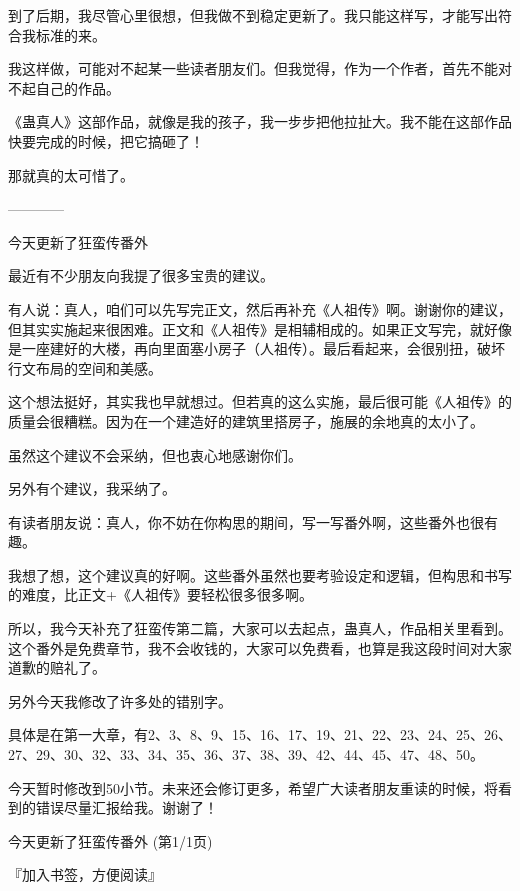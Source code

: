 \begin{this_body}
到了后期，我尽管心里很想，但我做不到稳定更新了。我只能这样写，才能写出符合我标准的来。

我这样做，可能对不起某一些读者朋友们。但我觉得，作为一个作者，首先不能对不起自己的作品。

《蛊真人》这部作品，就像是我的孩子，我一步步把他拉扯大。我不能在这部作品快要完成的时候，把它搞砸了！

那就真的太可惜了。

------------

今天更新了狂蛮传番外

最近有不少朋友向我提了很多宝贵的建议。

有人说：真人，咱们可以先写完正文，然后再补充《人祖传》啊。谢谢你的建议，但其实实施起来很困难。正文和《人祖传》是相辅相成的。如果正文写完，就好像是一座建好的大楼，再向里面塞小房子（人祖传）。最后看起来，会很别扭，破坏行文布局的空间和美感。

这个想法挺好，其实我也早就想过。但若真的这么实施，最后很可能《人祖传》的质量会很糟糕。因为在一个建造好的建筑里搭房子，施展的余地真的太小了。

虽然这个建议不会采纳，但也衷心地感谢你们。

另外有个建议，我采纳了。

有读者朋友说：真人，你不妨在你构思的期间，写一写番外啊，这些番外也很有趣。

我想了想，这个建议真的好啊。这些番外虽然也要考验设定和逻辑，但构思和书写的难度，比正文+《人祖传》要轻松很多很多啊。

所以，我今天补充了狂蛮传第二篇，大家可以去起点，蛊真人，作品相关里看到。这个番外是免费章节，我不会收钱的，大家可以免费看，也算是我这段时间对大家道歉的赔礼了。

另外今天我修改了许多处的错别字。

具体是在第一大章，有2、3、8、9、15、16、17、19、21、22、23、24、25、26、27、29、30、32、33、34、35、36、37、38、39、42、44、45、47、48、50。

今天暂时修改到50小节。未来还会修订更多，希望广大读者朋友重读的时候，将看到的错误尽量汇报给我。谢谢了！

今天更新了狂蛮传番外 (第1/1页)

『加入书签，方便阅读』

\end{this_body}

